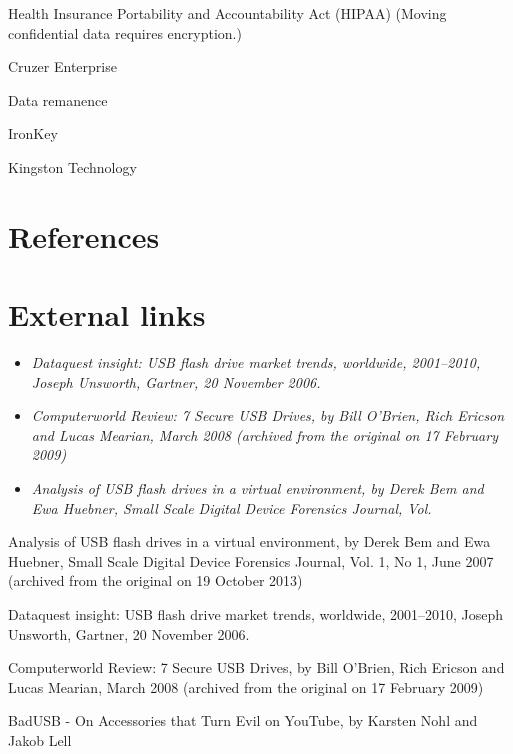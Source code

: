 Health Insurance Portability and Accountability Act (HIPAA) (Moving
confidential data requires encryption.)

Cruzer Enterprise

Data remanence

IronKey

Kingston Technology

\section{References}\label{references}

\section{External links}\label{external-links}

\begin{itemize}
\item
  \emph{Dataquest insight: USB flash drive market trends, worldwide,
  2001--2010, Joseph Unsworth, Gartner, 20 November 2006.}
\item
  \emph{Computerworld Review: 7 Secure USB Drives, by Bill O'Brien, Rich
  Ericson and Lucas Mearian, March 2008 (archived from the original on
  17 February 2009)}
\item
  \emph{Analysis of USB flash drives in a virtual environment, by Derek
  Bem and Ewa Huebner, Small Scale Digital Device Forensics Journal,
  Vol.}
\end{itemize}

Analysis of USB flash drives in a virtual environment, by Derek Bem and
Ewa Huebner, Small Scale Digital Device Forensics Journal, Vol. 1, No 1,
June 2007 (archived from the original on 19 October 2013)

Dataquest insight: USB flash drive market trends, worldwide, 2001--2010,
Joseph Unsworth, Gartner, 20 November 2006.

Computerworld Review: 7 Secure USB Drives, by Bill O'Brien, Rich Ericson
and Lucas Mearian, March 2008 (archived from the original on 17 February
2009)

BadUSB - On Accessories that Turn Evil on YouTube, by Karsten Nohl and
Jakob Lell
